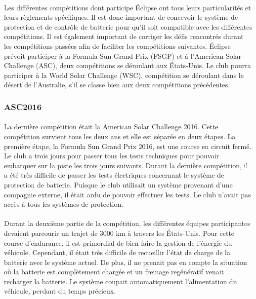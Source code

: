 		\paragraph{}
		Les différentes compétitions dont participe Éclipse ont tous leurs particularités et leurs règlements spécifiques. Il est donc important de concevoir le système de protection et de contrôle de batterie pour qu'il soit compatible avec les différentes compétitions. Il est également important de corriger les défis rencontrés durant les compétitions passées afin de faciliter les compétitions suivantes. Éclipse prévoit participer à la Formula Sun Grand Prix (FSGP) et à l'American Solar Challenge (ASC), deux compétitions se déroulant aux États-Unis. Le club pourra participer à la World Solar Challenge (WSC), compétition se déroulant dans le désert de l'Australie, s'il se classe bien aux deux compétitions précédentes.
		
	\subsubsection{ASC2016}
	
		\paragraph{}
		La dernière compétition était la American Solar Challenge 2016. Cette compétition survient tous les deux ans et elle est séparée en deux étapes. La première étape, la Formula Sun Grand Prix 2016, est une course en circuit fermé. Le club a trois jours pour passer tous les tests techniques pour pouvoir embarquer sur la piste les trois jours suivants. Durant la dernière compétition, il a été très difficile de passer les tests électriques concernant le système de protection de batterie. Puisque le club utilisait un système provenant d'une compagnie externe, il était ardu de pouvoir effectuer les tests. Le club n'avait pas accès à tous les systèmes de protection.
		
		\paragraph{}
		Durant la deuxième partie de la compétition, les différentes équipes participantes devaient parcourir un trajet de 3000 km à travers les États-Unis. Pour cette course d'endurance, il est primordial de bien faire la gestion de l'énergie du véhicule. Cependant, il était très difficile de recueillir l'état de charge de la batterie avec le système actuel. De plus, il ne prenait pas en compte la situation où la batterie est complètement chargée et un freinage regénératif venait recharger la batterie. Le système coupait automatiquement l'alimentation du véhicule, perdant du temps précieux.
		
